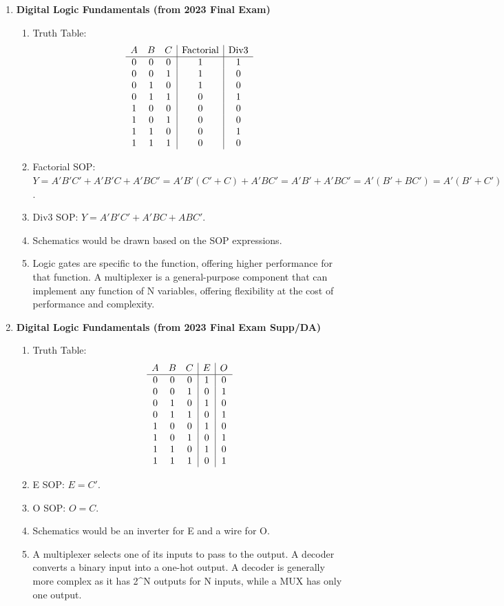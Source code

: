\documentclass[11pt]{article}
\begin{document}
\begin{enumerate}[label=\textbf{C\arabic*.}]
  \item \textbf{Digital Logic Fundamentals (from 2023 Final Exam)}
  \begin{enumerate}
    \item[A.] Truth Table:
    \[
    \begin{array}{c c c|c|c}
    A & B & C & \text{Factorial} & \text{Div3} \\\hline
    0 & 0 & 0 & 1 & 1 \\
    0 & 0 & 1 & 1 & 0 \\
    0 & 1 & 0 & 1 & 0 \\
    0 & 1 & 1 & 0 & 1 \\
    1 & 0 & 0 & 0 & 0 \\
    1 & 0 & 1 & 0 & 0 \\
    1 & 1 & 0 & 0 & 1 \\
    1 & 1 & 1 & 0 & 0
    \end{array}
    \]
    \item[B.] Factorial SOP: \(Y = A'B'C' + A'B'C + A'BC' = A'B'(C' + C) + A'BC' = A'B' + A'BC' = A'(B' + BC') = A'(B' + C')\).
    \item[C.] Div3 SOP: \(Y = A'B'C' + A'BC + ABC'\).
    \item[D.] Schematics would be drawn based on the SOP expressions.
    \item[E.] Logic gates are specific to the function, offering higher performance for that function. A multiplexer is a general-purpose component that can implement any function of N variables, offering flexibility at the cost of performance and complexity.
  \end{enumerate}

  \item \textbf{Digital Logic Fundamentals (from 2023 Final Exam Supp/DA)}
  \begin{enumerate}
    \item[A.] Truth Table:
    \[
    \begin{array}{c c c|c|c}
    A & B & C & E & O \\\hline
    0 & 0 & 0 & 1 & 0 \\
    0 & 0 & 1 & 0 & 1 \\
    0 & 1 & 0 & 1 & 0 \\
    0 & 1 & 1 & 0 & 1 \\
    1 & 0 & 0 & 1 & 0 \\
    1 & 0 & 1 & 0 & 1 \\
    1 & 1 & 0 & 1 & 0 \\
    1 & 1 & 1 & 0 & 1
    \end{array}
    \]
    \item[B.] E SOP: \(E = C'\).
    \item[C.] O SOP: \(O = C\).
    \item[D.] Schematics would be an inverter for E and a wire for O.
    \item[E.] A multiplexer selects one of its inputs to pass to the output. A decoder converts a binary input into a one-hot output. A decoder is generally more complex as it has 2\textasciicircum N outputs for N inputs, while a MUX has only one output.
  \end{enumerate}


\end{enumerate}
\end{document}
